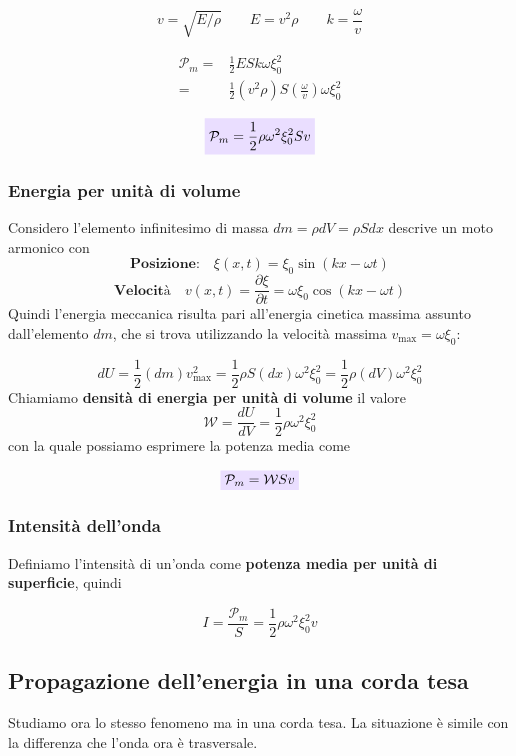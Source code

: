 \documentclass[x11names]{report}
\newcommand{\viola}[1]{\colorbox{yred}{$\displaystyle #1$}}
\begin{document}
	\[ 
	\boxed{v = \sqrt{E/\rho} \qquad E = v^2 \rho} \qquad \boxed{k = \frac{\omega}{v}}
	\]
	
	\begin{align*}
		\mathcal{P}_m =& \frac{1}{2} ESk\omega \xi_0^2  \\
			=& \frac{1}{2} (v^2 \rho)S\left(\frac{\omega}{v}\right) \omega\xi_0^2 
	\end{align*}
	
	\begin{equation}
		\viola{\mathcal{P}_m = \frac{1}{2}\rho \omega^2 \xi_{0}^2 S v}
	\end{equation}
	
	
	\subsubsection{Energia per unità di volume}
	Considero l'elemento infinitesimo di massa \(dm = \rho dV = \rho S dx\) descrive un moto armonico con 
	\[ 
	\textbf{Posizione:} \quad \xi(x,t) = \xi_0\sin\left(kx - \omega t\right) 
	\]
	\[ 
	\textbf{Velocità} \quad v(x,t)= \frac{\partial\xi}{\partial t} = \omega \xi_0\cos\left(kx - \omega t\right) 
	\]
	Quindi l'energia meccanica risulta pari all'energia cinetica massima assunto dall'elemento \(dm\), che si trova utilizzando la velocità massima \(v_{\text{max}} = \omega \xi_0\):
	
	\[ 
	dU = \frac{1}{2}(dm)v_{\text{max}}^2 = \frac{1}{2}\rho S (dx)\omega^2 \xi_0^2 = \frac{1}{2}\rho (dV)\omega^2 \xi_0^2
	\]
	Chiamiamo \textbf{densità di energia per unità di volume} il valore 
	\[
	\mathcal{W} = \frac{dU}{dV} = \frac{1}{2}\rho \omega^2\xi_0^2
	\]
	con la quale possiamo esprimere la potenza media come 
	
	\begin{equation}
		\viola{\mathcal{P}_m = \mathcal{W}S v}
	\end{equation}

	
	\subsubsection{Intensità dell'onda}
	Definiamo l'intensità di un'onda come  \textbf{potenza media per unità di superficie}, quindi
	
	\[
	I = \frac{\mathcal{P}_m}{S} = \frac{1}{2}\rho\omega^2\xi_0^2v
	\]
	
	\subsection{Propagazione dell'energia in una corda tesa}
	Studiamo ora lo stesso fenomeno ma in una corda tesa. La situazione è simile con la differenza che l'onda ora è trasversale.
	
\end{document}
